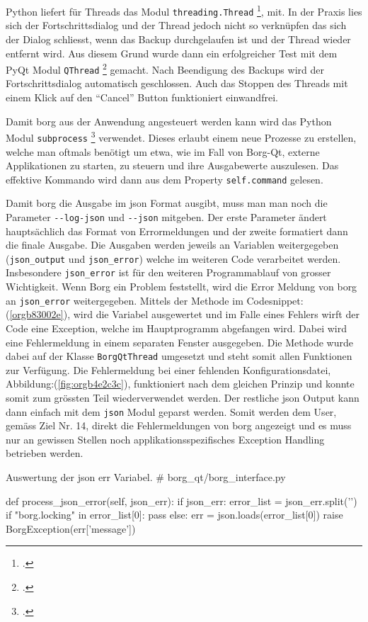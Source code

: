 Python liefert für Threads das Modul \texttt{threading.Thread} \footcite{threading},
mit. In der Praxis lies sich der Fortschrittsdialog und der Thread jedoch nicht
so verknüpfen das sich der Dialog schliesst, wenn das Backup durchgelaufen
ist und der Thread wieder entfernt wird. Aus diesem Grund wurde dann ein
erfolgreicher Test mit dem PyQt Modul \texttt{QThread} \footcite{qthread} gemacht. Nach
Beendigung des Backups wird der Fortschrittsdialog automatisch geschlossen.
Auch das Stoppen des Threads mit einem Klick auf den "`Cancel"' Button
funktioniert einwandfrei.

Damit \gls{borg} aus der Anwendung angesteuert werden kann wird das Python Modul
\texttt{subprocess} \footcite{subprocess} verwendet. Dieses erlaubt einem neue Prozesse
zu erstellen, welche man oftmals benötigt um etwa, wie im Fall von Borg-Qt,
externe Applikationen zu starten, zu steuern und ihre Ausgabewerte auszulesen.
Das effektive Kommando wird dann aus dem Property \texttt{self.command} gelesen.

Damit \gls{borg} die Ausgabe im \gls{json} Format ausgibt, muss man man noch die
Parameter \texttt{-{}-log-json} und \texttt{-{}-json} mitgeben. Der erste Parameter ändert
hauptsächlich das Format von Errormeldungen und der zweite formatiert dann die
finale Ausgabe. Die Ausgaben werden jeweils an Variablen weitergegeben
(\texttt{json\_output} und \texttt{json\_error}) welche im weiteren Code verarbeitet werden.
\newpage
Insbesondere \texttt{json\_error} ist für den weiteren Programmablauf von grosser
Wichtigkeit. Wenn Borg ein Problem feststellt, wird die Error Meldung von
\gls{borg} an \texttt{json\_error} weitergegeben. Mittels der Methode im
Codesnippet:(\ref{orgb83002e}), wird die Variabel ausgewertet und im Falle eines
Fehlers wirft der Code eine Exception, welche im Hauptprogramm abgefangen wird.
Dabei wird eine Fehlermeldung in einem separaten Fenster ausgegeben. Die
Methode wurde dabei auf der Klasse \texttt{BorgQtThread} umgesetzt und steht somit
allen Funktionen zur Verfügung. Die Fehlermeldung bei einer fehlenden
Konfigurationsdatei, Abbildung:(\ref{fig:orgb4e2c3c}), funktioniert nach
dem gleichen Prinzip und konnte somit zum grössten Teil wiederverwendet werden.
Der restliche \gls{json} Output kann dann einfach mit dem \texttt{json} Modul geparst
werden. Somit werden dem User, gemäss Ziel Nr. 14, direkt die Fehlermeldungen
von \gls{borg} angezeigt und es muss nur an gewissen Stellen noch
applikationsspezifisches Exception Handling betrieben werden.

\begin{sexylisting}[label=orgb83002e]{Auswertung der json err Variabel.}
# borg_qt/borg_interface.py

def process_json_error(self, json_err):
    if json_err:
        error_list = json_err.split('\n')
        if "borg.locking" in error_list[0]:
            pass
        else:
            err = json.loads(error_list[0])
            raise BorgException(err['message'])
\end{sexylisting}

